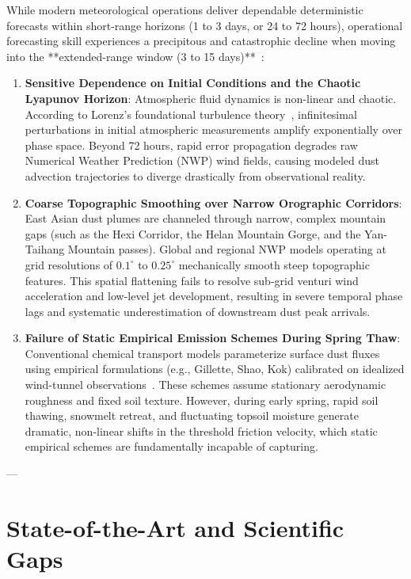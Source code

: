 While modern meteorological operations deliver dependable deterministic forecasts within short-range horizons (1 to 3 days, or 24 to 72 hours), operational forecasting skill experiences a precipitous and catastrophic decline when moving into the **extended-range window (3 to 15 days)**~\cite{ref2,ref10}:
\begin{enumerate}
    \item \textbf{Sensitive Dependence on Initial Conditions and the Chaotic Lyapunov Horizon}: Atmospheric fluid dynamics is non-linear and chaotic. According to Lorenz's foundational turbulence theory~\cite{lorenz1963deterministic}, infinitesimal perturbations in initial atmospheric measurements amplify exponentially over phase space. Beyond 72 hours, rapid error propagation degrades raw Numerical Weather Prediction (NWP) wind fields, causing modeled dust advection trajectories to diverge drastically from observational reality.
    \item \textbf{Coarse Topographic Smoothing over Narrow Orographic Corridors}: East Asian dust plumes are channeled through narrow, complex mountain gaps (such as the Hexi Corridor, the Helan Mountain Gorge, and the Yan-Taihang Mountain passes). Global and regional NWP models operating at grid resolutions of $0.1^\circ$ to $0.25^\circ$ mechanically smooth steep topographic features. This spatial flattening fails to resolve sub-grid venturi wind acceleration and low-level jet development, resulting in severe temporal phase lags and systematic underestimation of downstream dust peak arrivals.
    \item \textbf{Failure of Static Empirical Emission Schemes During Spring Thaw}: Conventional chemical transport models parameterize surface dust fluxes using empirical formulations (e.g., Gillette, Shao, Kok) calibrated on idealized wind-tunnel observations~\cite{gillette1979environmental,shao2008physics,kok2012physics}. These schemes assume stationary aerodynamic roughness and fixed soil texture. However, during early spring, rapid soil thawing, snowmelt retreat, and fluctuating topsoil moisture generate dramatic, non-linear shifts in the threshold friction velocity, which static empirical schemes are fundamentally incapable of capturing.
\end{enumerate}

---

\section{State-of-the-Art and Scientific Gaps}
\label{sec:literature_summary}

